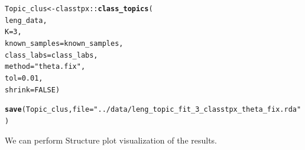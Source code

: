 \documentclass[12pt]{article}\usepackage[]{graphicx}\usepackage[usenames,dvipsnames]{color}
\makeatletter
\newcommand{\hlnum}[1]{\textcolor[rgb]{0.686,0.059,0.569}{#1}}%
\newcommand{\hlstr}[1]{\textcolor[rgb]{0.192,0.494,0.8}{#1}}%
\newcommand{\hlopt}[1]{\textcolor[rgb]{0,0,0}{#1}}%
\newcommand{\hlstd}[1]{\textcolor[rgb]{0.345,0.345,0.345}{#1}}%
\newcommand{\hlkwb}[1]{\textcolor[rgb]{0.69,0.353,0.396}{#1}}%
\newcommand{\hlkwc}[1]{\textcolor[rgb]{0.333,0.667,0.333}{#1}}%
\newcommand{\hlkwd}[1]{\textcolor[rgb]{0.737,0.353,0.396}{\textbf{#1}}}%
\newenvironment{kframe}{%
 \def\at@end@of@kframe{}%
 \ifinner\ifhmode%
  \def\at@end@of@kframe{\end{minipage}}%
  \begin{minipage}{\columnwidth}%
 \fi\fi%
 \def\FrameCommand##1{\hskip\@totalleftmargin \hskip-\fboxsep
 \colorbox{shadecolor}{##1}\hskip-\fboxsep
     \hskip-\linewidth \hskip-\@totalleftmargin \hskip\columnwidth}%
 \MakeFramed {\advance\hsize-\width
   \@totalleftmargin\z@ \linewidth\hsize
   \@setminipage}}%
 {\par\unskip\endMakeFramed%
 \at@end@of@kframe}
\newenvironment{knitrout}{}{} %
\makeatother
\begin{document}
\begin{knitrout}
\color{fgcolor}\begin{kframe}
\begin{alltt}
\hlstd{Topic_clus} \hlkwb{<-} \hlstd{classtpx}\hlopt{::}\hlkwd{class_topics}\hlstd{(}
    \hlstd{leng_data,}
    \hlkwc{K}\hlstd{=}\hlnum{3}\hlstd{,}
    \hlkwc{known_samples} \hlstd{= known_samples,}
    \hlkwc{class_labs} \hlstd{= class_labs,}
    \hlkwc{method}\hlstd{=}\hlstr{"theta.fix"}\hlstd{,}
    \hlkwc{tol}\hlstd{=}\hlnum{0.01}\hlstd{,}
    \hlkwc{shrink}\hlstd{=}\hlnum{FALSE}\hlstd{)}

\hlkwd{save}\hlstd{(Topic_clus,} \hlkwc{file}\hlstd{=}\hlstr{"../data/leng_topic_fit_3_classtpx_theta_fix.rda"}\hlstd{)}
\end{alltt}
\end{kframe}
\end{knitrout}

We can perform Structure plot visualization of the results.
\end{document}
